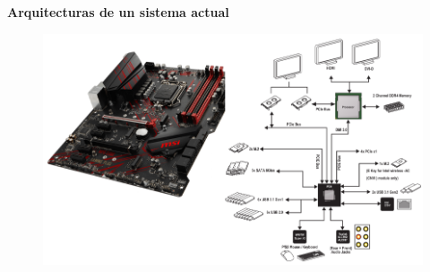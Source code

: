 \documentclass{article}
\begin{document}
\textbf{Arquitecturas de un sistema actual}
\begin{figure}[h]
\centering
\includegraphics[scale=1,width=\textwidth]{arquitectura_actual.png}
\end{figure}
\end{document}
